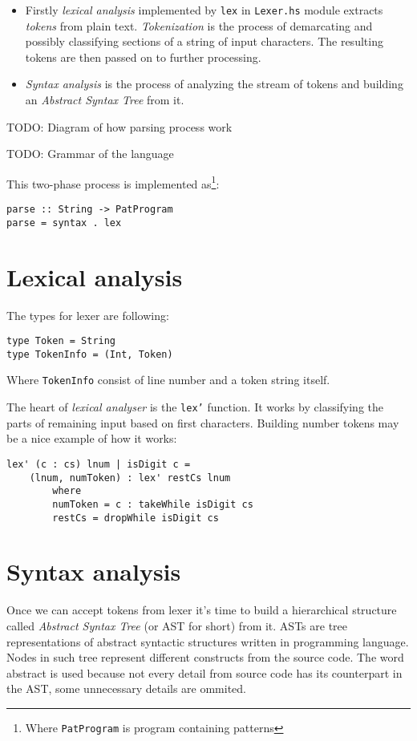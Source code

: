 \documentclass[a4paper]{report}
\begin{document}
\begin{itemize}
  \item Firstly \textit{lexical analysis} implemented by \texttt{lex} in
    \texttt{Lexer.hs} module extracts \textit{tokens} from plain text.
    \textit{Tokenization} is the process of demarcating and possibly
    classifying sections of a string of input characters. The resulting tokens
    are then passed on to further processing.
  \item \textit{Syntax analysis} is the process of analyzing the stream of
    tokens and building an \textit{Abstract Syntax Tree} from it.
\end{itemize}


TODO: Diagram of how parsing process work

TODO: Grammar of the language

This two-phase process is implemented as\footnote{Where \texttt{PatProgram}
is program containing patterns}:

\begin{lstlisting}
parse :: String -> PatProgram
parse = syntax . lex
\end{lstlisting}

\section{Lexical analysis}

The types for lexer are following:
\begin{lstlisting}
type Token = String
type TokenInfo = (Int, Token)
\end{lstlisting}
Where \texttt{TokenInfo} consist of line number and a token string itself.

The heart of \textit{lexical analyser} is the \texttt{lex'} function. It works
by classifying the parts of remaining input based on first characters.
Building number tokens may be a nice example of how it works:

\begin{lstlisting}[label=lst:lex_comment,caption={Building tokens from numbers.}]
lex' (c : cs) lnum | isDigit c =
    (lnum, numToken) : lex' restCs lnum
        where
        numToken = c : takeWhile isDigit cs
        restCs = dropWhile isDigit cs
\end{lstlisting}


\section{Syntax analysis}
\label{sec:syntax_analysis}
Once we can accept tokens from lexer it's time to build a hierarchical
structure called \textit{Abstract Syntax Tree} (or AST for short) from it. ASTs
are tree representations of abstract syntactic structures written in
programming language. Nodes in such tree represent different constructs from
the source code. The word abstract is used because not every detail from source
code has its counterpart in the AST, some unnecessary details are ommited.
\end{document}
